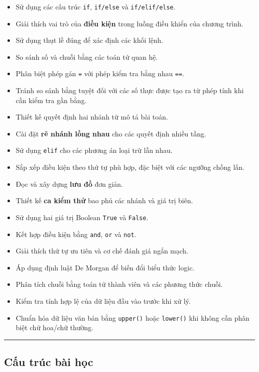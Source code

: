 \documentclass[
  11pt,
  a4paper,
]{article}
\providecommand{\tightlist}{%
  \setlength{\itemsep}{0pt}\setlength{\parskip}{0pt}}
\begin{document}
\begin{itemize}
\tightlist
\item
  Sử dụng các cấu trúc \texttt{if}, \texttt{if/else} và
  \texttt{if/elif/else}.
\item
  Giải thích vai trò của \textbf{điều kiện} trong luồng điều khiển của
  chương trình.
\item
  Sử dụng thụt lề đúng để xác định các khối lệnh.
\item
  So sánh số và chuỗi bằng các toán tử quan hệ.
\item
  Phân biệt phép gán \texttt{=} với phép kiểm tra bằng nhau \texttt{==}.
\item
  Tránh so sánh bằng tuyệt đối với các số thực được tạo ra từ phép tính
  khi cần kiểm tra gần bằng.
\item
  Thiết kế quyết định hai nhánh từ mô tả bài toán.
\item
  Cài đặt \textbf{rẽ nhánh lồng nhau} cho các quyết định nhiều tầng.
\item
  Sử dụng \texttt{elif} cho các phương án loại trừ lẫn nhau.
\item
  Sắp xếp điều kiện theo thứ tự phù hợp, đặc biệt với các ngưỡng chồng
  lấn.
\item
  Đọc và xây dựng \textbf{lưu đồ} đơn giản.
\item
  Thiết kế \textbf{ca kiểm thử} bao phủ các nhánh và giá trị biên.
\item
  Sử dụng hai giá trị Boolean \texttt{True} và \texttt{False}.
\item
  Kết hợp điều kiện bằng \texttt{and}, \texttt{or} và \texttt{not}.
\item
  Giải thích thứ tự ưu tiên và cơ chế đánh giá ngắn mạch.
\item
  Áp dụng định luật De Morgan để biến đổi biểu thức logic.
\item
  Phân tích chuỗi bằng toán tử thành viên và các phương thức chuỗi.
\item
  Kiểm tra tính hợp lệ của dữ liệu đầu vào trước khi xử lý.
\item
  Chuẩn hóa dữ liệu văn bản bằng \texttt{upper()} hoặc \texttt{lower()}
  khi không cần phân biệt chữ hoa/chữ thường.
\end{itemize}

\begin{center}\rule{0.5\linewidth}{0.5pt}\end{center}

\subsection{Cấu trúc bài học}\label{cux1ea5u-truxfac-buxe0i-hux1ecdc}
\end{document}
